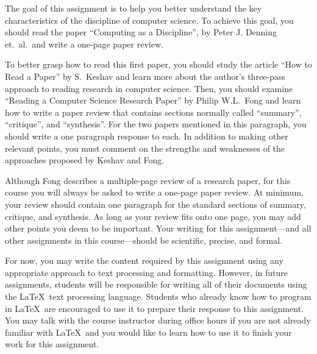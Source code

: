 



The goal of this assignment is to help you better understand the key characteristics of the discipline of computer
science. To achieve this goal, you should read the paper ``Computing as a Discipline'', by Peter J. Denning et.\ al.\
and write a one-page paper review.

To better grasp how to read this first paper, you should study the article ``How to Read a Paper'' by S.\ Keshav
and learn more about the author's three-pass approach to reading research in computer science. Then, you should examine
``Reading a Computer Science Research Paper'' by Philip W.L.\ Fong and learn how to write a paper review that contains
sections normally called ``summary'', ``critique'', and ``synthesis''. For the two papers mentioned in this paragraph,
you should write a one paragraph response to each. In addition to making other relevant points, you must comment on
the strengths and weaknesses of the approaches proposed by Keshav and Fong.

Although Fong describes a multiple-page review of a research paper, for this course you will always be asked to write a
one-page paper review. At minimum, your review should contain one paragraph for the standard sections of summary,
critique, and synthesis. As long as your review fits onto one page, you may add other points you deem to be important.
Your writing for this assignment---and all other assignments in this course---should be scientific, precise, and formal.

For now, you may write the content required by this assignment using any appropriate approach to text processing and
formatting.  However, in future assignments, students will be responsible for writing all of their documents using the
\LaTeX\ text processing language. Students who already know how to program in \LaTeX\ are encouraged to use it to
prepare their response to this assignment. You may talk with the course instructor during office hours if you are not
already familiar with \LaTeX\ and you would like to learn how to use it to finish your work for this assignment.







